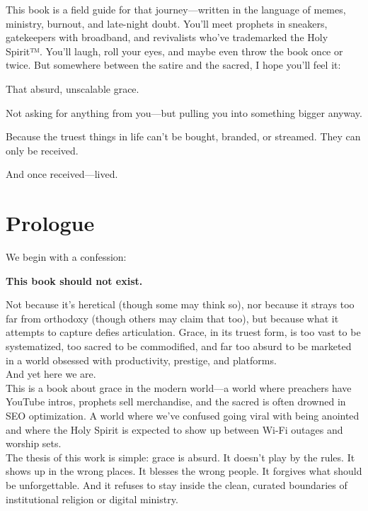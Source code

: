 \documentclass[a4paper,11pt]{book}
\begin{document}
This book is a field guide for that journey—written in the language of memes, ministry, burnout, and late-night doubt. You’ll meet prophets in sneakers, gatekeepers with broadband, and revivalists who’ve trademarked the Holy Spirit™. You’ll laugh, roll your eyes, and maybe even throw the book once or twice. But somewhere between the satire and the sacred, I hope you’ll feel it:

That absurd, unscalable grace.

Not asking for anything from you—but pulling you into something bigger anyway.

Because the truest things in life can’t be bought, branded, or streamed.
They can only be received.

And once received—lived.

\chapter*{Prologue}

We begin with a confession:\\
\begin{center}
\textbf{This book should not exist.\\}
\end{center}

Not because it’s heretical (though some may think so), nor because it strays too far from orthodoxy (though others may claim that too), but because what it attempts to capture defies articulation. Grace, in its truest form, is too vast to be systematized, too sacred to be commodified, and far too absurd to be marketed in a world obsessed with productivity, prestige, and platforms.\\

And yet here we are.\\

This is a book about grace in the modern world—a world where preachers have YouTube intros, prophets sell merchandise, and the sacred is often drowned in SEO optimization. A world where we’ve confused going viral with being anointed and where the Holy Spirit is expected to show up between Wi-Fi outages and worship sets.\\

The thesis of this work is simple: grace is absurd. It doesn’t play by the rules. It shows up in the wrong places. It blesses the wrong people. It forgives what should be unforgettable. And it refuses to stay inside the clean, curated boundaries of institutional religion or digital ministry.\\
\end{document}
